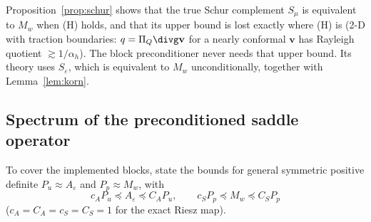 \documentclass[11pt]{article}
\numberwithin{equation}{section}
\theoremstyle{remark}
\newcommand{\eps}{\varepsilon}
\newcommand{\vv}{\mathbf{v}}
\newcommand{\Ae}{A_{\eps}}
\newcommand{\Mw}{M_{w}}
\newcommand{\Pq}{\Pi_{Q}}
\begin{document}
Proposition~\ref{prop:schur} shows that the true Schur complement $S_\mu$ is
equivalent to $\Mw$ when (H) holds, and that its upper bound is
lost exactly where (H) is (2-D with traction boundaries: $q =
\Pq\divg\vv$ for a nearly conformal $\vv$ has Rayleigh quotient
$\gtrsim1/\alpha_h$). The block preconditioner never needs that upper
bound. Its theory uses $S_\eps$, which is equivalent to $\Mw$
unconditionally, together with Lemma~\ref{lem:korn}.

\subsection{Spectrum of the preconditioned saddle operator}
\label{sec:spectrum}

To cover the implemented blocks, state the bounds for general symmetric
positive definite $P_u\approx\Ae$ and $P_p\approx\Mw$, with
\begin{equation}
  c_A P_u\preceq\Ae\preceq C_AP_u,
  \qquad
  c_S P_p\preceq\Mw\preceq C_SP_p
  \label{eq:equiv}
\end{equation}
($c_A = C_A = c_S = C_S = 1$ for the exact Riesz map).
\end{document}
